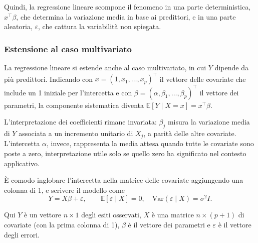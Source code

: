 \documentclass[
  italian,
  a4paper,
  a4paper,
  twoside,
  open=right,
  12pt]{scrbook}
\theoremstyle{definition}
\theoremstyle{remark}
\begin{document}
Quindi, la regressione lineare scompone il fenomeno in una parte
deterministica, \(x^\top \beta\), che determina la variazione media in
base ai predittori, e in una parte aleatoria, \(\varepsilon\), che
cattura la variabilità non spiegata.

\subsubsection{Estensione al caso
multivariato}\label{estensione-al-caso-multivariato}

La regressione lineare si estende anche al caso multivariato, in cui
\(Y\) dipende da più predittori. Indicando con
\(x = (1, x_1,\dots,x_p)^\top\) il vettore delle covariate che include
un 1 iniziale per l'intercetta e con
\(\beta = (\alpha,\beta_1,\dots,\beta_p)^\top\) il vettore dei
parametri, la componente sistematica diventa
\(\mathbb{E}[Y \mid X=x] = x^\top \beta\).

L'interpretazione dei coefficienti rimane invariata: \(\beta_j\) misura
la variazione media di \(Y\) associata a un incremento unitario di
\(X_j\), a parità delle altre covariate. L'intercetta \(\alpha\),
invece, rappresenta la media attesa quando tutte le covariate sono poste
a zero, interpretazione utile solo se quello zero ha significato nel
contesto applicativo.

\begin{tcolorbox}[enhanced jigsaw, breakable, colframe=quarto-callout-note-color-frame, toprule=.15mm, title=\textcolor{quarto-callout-note-color}{\faInfo}\hspace{0.5em}{Nota}, arc=.35mm, colback=white, bottomrule=.15mm, bottomtitle=1mm, colbacktitle=quarto-callout-note-color!10!white, toptitle=1mm, titlerule=0mm, opacityback=0, rightrule=.15mm, opacitybacktitle=0.6, leftrule=.75mm, left=2mm, coltitle=black]

È comodo inglobare l'intercetta nella matrice delle covariate
aggiungendo una colonna di 1, e scrivere il modello come \[
Y = X\beta + \varepsilon,\qquad \mathbb{E}[\varepsilon \mid X]=0,\quad \mathrm{Var}(\varepsilon \mid X)=\sigma^2 I.
\]

Qui \(Y\) è un vettore \(n\times 1\) degli esiti osservati, \(X\) è una
matrice \(n\times (p+1)\) di covariate (con la prima colonna di 1),
\(\beta\) è il vettore dei parametri e \(\varepsilon\) è il vettore
degli errori.

\end{tcolorbox}
\end{document}
